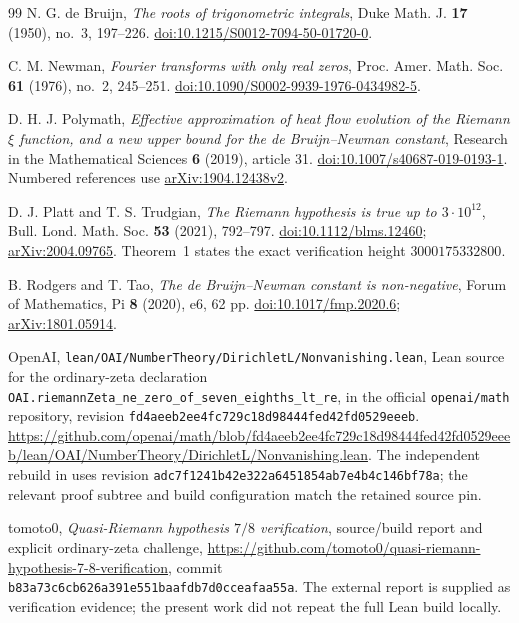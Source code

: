 \documentclass[11pt,a4paper]{article}
\theoremstyle{definition}
\theoremstyle{remark}
\begin{document}
\endgroup

\clearpage
\begin{thebibliography}{99}
N. G. de Bruijn, \emph{The roots of trigonometric integrals},
Duke Math. J. \textbf{17} (1950), no.~3, 197--226.
\href{https://doi.org/10.1215/S0012-7094-50-01720-0}{doi:10.1215/S0012-7094-50-01720-0}.

C. M. Newman, \emph{Fourier transforms with only real zeros},
Proc. Amer. Math. Soc. \textbf{61} (1976), no.~2, 245--251.
\href{https://doi.org/10.1090/S0002-9939-1976-0434982-5}{doi:10.1090/S0002-9939-1976-0434982-5}.

D. H. J. Polymath, \emph{Effective approximation of heat flow evolution
of the Riemann $\xi$ function, and a new upper bound for the
de Bruijn--Newman constant}, Research in the Mathematical Sciences
\textbf{6} (2019), article 31.
\href{https://doi.org/10.1007/s40687-019-0193-1}{doi:10.1007/s40687-019-0193-1}.
Numbered references use
\href{https://arxiv.org/abs/1904.12438v2}{arXiv:1904.12438v2}.

D. J. Platt and T. S. Trudgian,
\emph{The Riemann hypothesis is true up to $3\cdot10^{12}$},
Bull. Lond. Math. Soc. \textbf{53} (2021), 792--797.
\href{https://doi.org/10.1112/blms.12460}{doi:10.1112/blms.12460};
\href{https://arxiv.org/abs/2004.09765}{arXiv:2004.09765}.
Theorem~1 states the exact verification height $3000175332800$.

B. Rodgers and T. Tao,
\emph{The de Bruijn--Newman constant is non-negative},
Forum of Mathematics, Pi \textbf{8} (2020), e6, 62 pp.
\href{https://doi.org/10.1017/fmp.2020.6}{doi:10.1017/fmp.2020.6};
\href{https://arxiv.org/abs/1801.05914}{arXiv:1801.05914}.

OpenAI, \nolinkurl{lean/OAI/NumberTheory/DirichletL/Nonvanishing.lean},
Lean source for the ordinary-zeta declaration
\nolinkurl{OAI.riemannZeta_ne_zero_of_seven_eighths_lt_re},
in the official \nolinkurl{openai/math} repository, revision
\nolinkurl{fd4aeeb2ee4fc729c18d98444fed42fd0529eeeb}.
\url{https://github.com/openai/math/blob/fd4aeeb2ee4fc729c18d98444fed42fd0529eeeb/lean/OAI/NumberTheory/DirichletL/Nonvanishing.lean}.
The independent rebuild in \cite{ExternalVerifier} uses revision
\nolinkurl{adc7f1241b42e322a6451854ab7e4b4c146bf78a}; the relevant proof
subtree and build configuration match the retained source pin.

tomoto0, \emph{Quasi-Riemann hypothesis $7/8$ verification},
source/build report and explicit ordinary-zeta challenge,
\url{https://github.com/tomoto0/quasi-riemann-hypothesis-7-8-verification},
commit \nolinkurl{b83a73c6cb626a391e551baafdb7d0cceafaa55a}.
The external report is supplied as verification evidence; the present
work did not repeat the full Lean build locally.


\end{thebibliography}
\end{document}
